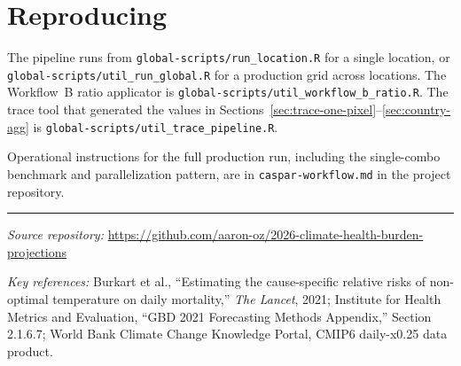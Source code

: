 \documentclass[11pt]{article}
\begin{document}
\section{Reproducing}

The pipeline runs from \texttt{global-scripts/run\_location.R} for a
single location, or \texttt{global-scripts/util\_run\_global.R} for a
production grid across locations. The Workflow~B ratio applicator is
\texttt{global-scripts/util\_workflow\_b\_ratio.R}. The trace tool that
generated the values in
Sections~\ref{sec:trace-one-pixel}--\ref{sec:country-agg} is
\texttt{global-scripts/util\_trace\_pipeline.R}.

Operational instructions for the full production run, including the
single-combo benchmark and parallelization pattern, are in
\texttt{caspar-workflow.md} in the project repository.

\bigskip
\hrule
\smallskip

\textit{Source repository:}
\url{https://github.com/aaron-oz/2026-climate-health-burden-projections}

\textit{Key references:}
Burkart et al., ``Estimating the cause-specific relative risks of
non-optimal temperature on daily mortality,''
\textit{The Lancet}, 2021;
Institute for Health Metrics and Evaluation, ``GBD 2021 Forecasting
Methods Appendix,'' Section 2.1.6.7;
World Bank Climate Change Knowledge Portal, CMIP6 daily-x0.25 data
product.
\end{document}
